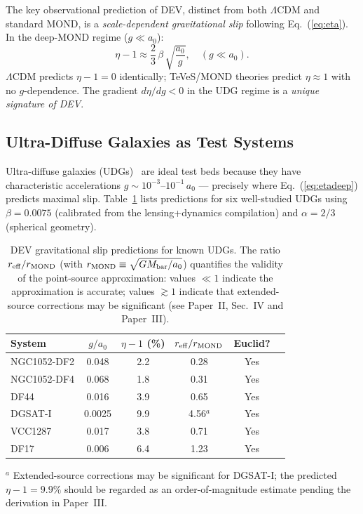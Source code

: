 \documentclass[aps,prd,twocolumn,showpacs,superscriptaddress]{revtex4-2}
\newcommand{\aO}{a_0}
\newcommand{\LCDM}{$\Lambda$CDM}
\begin{document}
The key observational prediction of DEV, distinct from both
\LCDM{} and standard MOND, is a \emph{scale-dependent gravitational slip}
following Eq.~(\ref{eq:eta}).
In the deep-MOND regime ($g \ll \aO$):
\begin{equation}
  \eta - 1 \approx \frac{2}{3}\,\beta\,\sqrt{\frac{\aO}{g}},
  \quad (g \ll \aO).
  \label{eq:etadeep}
\end{equation}
\LCDM{} predicts $\eta - 1 = 0$ identically;
TeVeS/MOND theories predict $\eta \approx 1$ with no $g$-dependence.
The gradient $d\eta/dg < 0$ in the UDG regime is a
\emph{unique signature of DEV}.

\subsection{Ultra-Diffuse Galaxies as Test Systems}

Ultra-diffuse galaxies (UDGs)~\cite{vanDokkum2015} are ideal test beds
because they have characteristic accelerations
$g \sim 10^{-3}$--$10^{-1}\,\aO$ —
precisely where Eq.~(\ref{eq:etadeep}) predicts maximal slip.
Table~\ref{tab:udg} lists predictions for six well-studied UDGs using
$\beta = 0.0075$ (calibrated from the lensing+dynamics compilation)
and $\alpha = 2/3$ (spherical geometry).

\begin{table}[h]
\caption{DEV gravitational slip predictions for known UDGs.
The ratio $r_{\rm eff}/r_{\rm MOND}$ (with
$r_{\rm MOND}\equiv\sqrt{GM_{\rm bar}/\aO}$) quantifies the validity
of the point-source approximation: values $\ll 1$ indicate the
approximation is accurate; values $\gtrsim 1$ indicate that
extended-source corrections may be significant (see Paper~II,
Sec.~IV and Paper~III).}
\label{tab:udg}
\begin{ruledtabular}
\begin{tabular}{lccccc}
System & $g/\aO$ & $\eta-1$ (\%) & $r_{\rm eff}/r_{\rm MOND}$ & Euclid? \\
\hline
NGC1052-DF2 & 0.048  & 2.2 & 0.28 & Yes \\
NGC1052-DF4 & 0.068  & 1.8 & 0.31 & Yes \\
DF44        & 0.016  & 3.9 & 0.65 & Yes \\
DGSAT-I     & 0.0025 & 9.9 & 4.56$^a$ & Yes \\
VCC1287     & 0.017  & 3.8 & 0.71 & Yes \\
DF17        & 0.006  & 6.4 & 1.23 & Yes \\
\end{tabular}
\end{ruledtabular}
{\small $^a$ Extended-source corrections may be significant for
DGSAT-I; the predicted $\eta-1=9.9\%$ should be regarded as an
order-of-magnitude estimate pending the derivation in Paper~III.}
\end{table}
\end{document}
